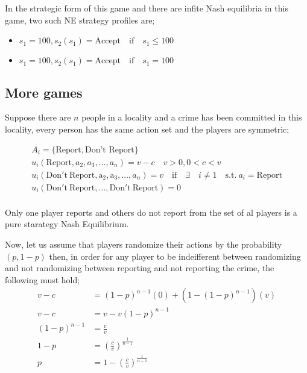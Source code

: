 \documentclass[12pt,a4paper,fleqn]{article}
\begin{document}
   In the strategic form of this game and there are infite Nash equilibria in this game, two such NE strategy profiles are;
    \begin{itemize}
     \item \(s_{1}=100,s_{2}(s_{1})=\mathrm{Accept} \quad \text{if} \quad s_{1}\leq 100\)
     \item \(s_{1}=100,s_{2}(s_{1})=\mathrm{Accept} \quad \text{if} \quad s_{1}= 100\)
    \end{itemize}

 \subsection{More games}
 Suppose there are \(n\) people in a locality and a crime has been committed in this locality, every person has the same action set and the players are symmetric;

 \begin{fleqn} 
 \begin{equation*}
   \begin{split}
    A_{i}=\{\text{Report},\text{Don't Report}\} \\
   u_{i}(\mathrm{Report},a_{2},a_{3},\ldots,a_{n})=v-c \quad v>0, 0<c<v\\
   u_{i}(\mathrm{Don't \ Report,a_{2},a_{3}},\ldots,a_{n})= v \quad \text{if} \quad \exists \quad i \neq 1 \quad \text{s.t.} \ a_{i}=\text{Report}\\
    u_{i}(\mathrm{Don't \ Report},\ldots,\mathrm{Don't \ Report})=0\\
   \end{split}
 \end{equation*}
\end{fleqn} 
 Only one player reports and others do not report from the set of al players is a pure starategy Nash Equilibrium.
 
 Now, let us assume that players randomize their actions by the probability 
 \(\left( p,1-p \right) \) then, in order for any player to be indeifferent between randomizing and not randomizing between reporting and not reporting the crime, the following must hold;
 \begin{align*}
  v-c&=(1-p)^{n-1}(0)+(1-(1-p)^{n-1})(v)\\
  v-c&=v-v(1-p)^{n-1}\\
  (1-p)^{n-1}&=\frac{c}{v}\\
  1-p&=\left( \frac{c}{v} \right)^{\frac{1}{n-1}}\\
  p&= 1- \left( \frac{c}{v} \right)^{\frac{1}{n-1}}\\  
 \end{align*}  
\end{document}
